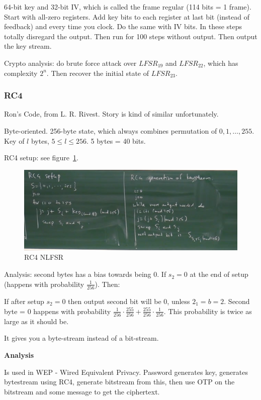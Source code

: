 \documentclass[language=english,number=]{homework}
\begin{document}
$64$-bit key and 32-bit IV, which is called the frame regular (114 bits = 1 frame).
Start with all-zero registers.
Add key bits to each register at last bit (instead of feedback) and every time you clock.
Do the same with IV bits.
In these steps totally disregard the output.
Then run for 100 steps without output.
Then output the key stream.

Crypto analysis: do brute force attack over $LFSR_{19}$ and $LFSR_{22}$, which has complexity $2^n$.
Then recover the initial state of $LFSR_{23}$.

\subsubsection{RC4}

Ron's Code, from L. R. Rivest.
Story is kind of similar unfortunately.

Byte-oriented.
    256-byte state, which always combines permutation of $0, 1, \dots, 255$.
    Key of $l$ bytes, $5 \le l \le 256$.
    5 bytes = 40 bits.

    RC4 setup: see figure~\ref{rc4}.

\begin{figure}[h!]
    \centering
    \includegraphics[width=\textwidth]{rc4.PNG}
    \caption{RC4 NLFSR}
    \label{rc4}
\end{figure}

    Analysis: second bytes has a bias towards being 0.
    If $s_2 = 0$ at the end of setup (happens with probability $\frac{1}{256}$).
    Then:


    If after setup $s_2 = 0$ then output second bit will be $0$, unless $2_1 = b = 2$.
    Second byte = 0 happens with probability $\frac{1}{256} \cdot \frac{255}{256} + \frac{255}{256} \cdot \frac{1}{256}$.
    This probability is twice as large as it should be.

    It gives you a byte-stream instead of a bit-stream.

\textbf{Analysis}

    Is used in WEP - Wired Equivalent Privacy.
    Password generates key, generates bytestream using RC4, generate bitstream from this, then use OTP on the bitstream and some message to get the ciphertext.
\end{document}
